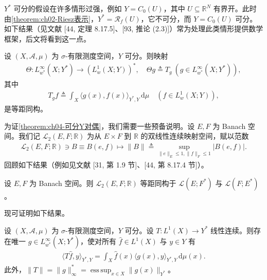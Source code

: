 \documentclass[../../main.tex]{subfiles}%
\begin{document}
$Y^*$ 可分的假设在许多情形过强，例如 $Y=C_0(U)$，其中 $U\subseteq\mathbb{R}^N$ 有界开。此时由\cref{theorem:ch02-Riesz表示}，$Y^*=\mathscr{R}_f(U)$，它不可分，而 $Y=C_0(U)$ 可分。如下结果（见文献 [44, 定理 8.17.5]、[93, 推论 (2.3)]）常为处理此类情形提供数学框架，后文将看到这一点。

\begin{theorem}\label{theorem:ch04-可分Y对偶}
设 $(X,\mathcal{A},\mu)$ 为 $\sigma$-有限测度空间，$Y$ 可分。则映射
\begin{align}
\Theta:L^\infty_{w^*}(X;Y^*)\to(L^1_w(X;Y))^*,\quad \Theta g\triangleq T_g\ (g\in L^\infty_{w^*}(X;Y^*)), \label{align:ch04-4.109a}
\end{align}
其中
\begin{align}
T_gf\triangleq \int_X\langle g(x),f(x)\rangle_{Y^*,Y}\,\mathrm{d}\mu\quad(f\in L^1_w(X;Y)), \label{align:ch04-4.109b}
\end{align}
是等距同构。
\end{theorem}

为证\cref{theorem:ch04-可分Y对偶}，我们需要一些预备说明。设 $E,F$ 为 Banach 空间。我们记 $\mathcal{L}_2(E,F;\mathbb{R})$ 为从 $E\times F$ 到 $\mathbb{R}$ 的双线性连续映射空间，赋以范数
\begin{align*}
\mathcal{L}_2(E,F;\mathbb{R})\ni B\equiv B(e,f)\mapsto\|B\|\triangleq \sup_{\|e\|_E\leqslant1,\|f\|_F\leqslant1}|B(e,f)|.
\end{align*}
回顾如下结果（例如见文献 [31, 第 1.9 节]、[44, 第 8.17.4 节]）。

\begin{proposition}\label{proposition:ch04-双线性等距}
设 $E,F$ 为 Banach 空间。则 $\mathcal{L}_2(E,F;\mathbb{R})$ 等距同构于 $\mathcal{L}(E;F^*)$ 与 $\mathcal{L}(F;E^*)$。
\end{proposition}

现可证明如下结果。

\begin{proposition}\label{proposition:ch04-弱星Gelfand表示}
设 $(X,\mathcal{A},\mu)$ 为 $\sigma$-有限测度空间，$Y$ 可分。设 $T:L^1(X)\to Y^*$ 线性连续。则存在唯一 $g\in L^\infty_{w^*}(X;Y^*)$，使对所有 $\hat f\in L^1(X)$ 与 $y\in Y$ 有
\begin{align}
\langle T\hat f,y\rangle_{Y^*,Y}=\int_X\hat f(x)\langle g(x),y\rangle_{Y^*,Y}\,\mathrm{d}\mu(x). \label{align:ch04-4.110}
\end{align}
此外，$\|T\|=\|g\|_\infty^*=\operatorname*{ess\,sup}_{x\in X}\|g(x)\|_{Y^*}$。
\end{proposition}
\end{document}
